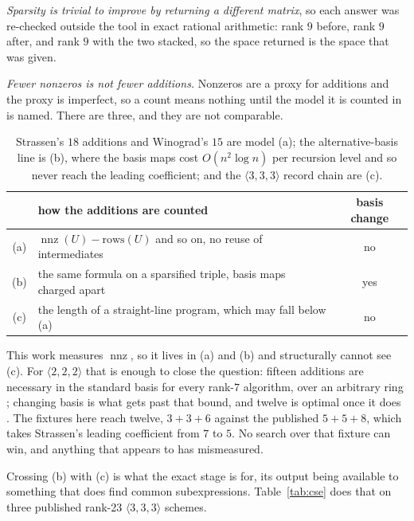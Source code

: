 \documentclass[11pt,reqno]{amsart}
\theoremstyle{plain}
\theoremstyle{definition}
\theoremstyle{remark}
\newcommand{\nnz}{\operatorname{nnz}}
\begin{document}
\emph{Sparsity is trivial to improve by returning a different matrix}, so each
answer was re-checked outside the tool in exact rational arithmetic: rank $9$
before, rank $9$ after, and rank $9$ with the two stacked, so the space returned
is the space that was given.

\emph{Fewer nonzeros is not fewer additions.} Nonzeros are a proxy for additions
and the proxy is imperfect, so a count means nothing until the model it is
counted in is named. There are three, and they are not comparable.

\begin{table}[ht]
\centering
\begin{tabular}{clc}
\toprule
 & how the additions are counted & basis change \\
\midrule
(a) & $\nnz(U)-\mathrm{rows}(U)$ and so on, no reuse of intermediates & no \\
(b) & the same formula on a sparsified triple, basis maps charged apart & yes \\
(c) & the length of a straight-line program, which may fall below (a) & no \\
\bottomrule
\end{tabular}
\vspace{0.5em}
\caption{Strassen's $18$ additions and Winograd's $15$ are model (a); the
alternative-basis line \cite{karstadt2017,beniamini2020,holtz2025} is (b), where
the basis maps cost $O(n^{2}\log n)$ per recursion level and so never reach the
leading coefficient; \cite{plinopt} and the $\langle 3,3,3\rangle$ record chain
are (c).}\label{tab:models}
\end{table}

This work measures $\nnz$, so it lives in (a) and (b) and structurally cannot see
(c). For $\langle 2,2,2\rangle$ that is enough to close the question: fifteen
additions are necessary in the standard basis for every rank-$7$ algorithm, over
an arbitrary ring \cite{probert1976,bshouty1995}; changing basis is what gets
past that bound, and twelve is optimal once it does
\cite[Thm.~1.2]{karstadt2017}. The fixtures here reach twelve, $3+3+6$ against
the published $5+5+8$, which takes Strassen's leading coefficient from $7$ to
$5$. No search over that fixture can win, and anything that appears to has
mismeasured.

Crossing (b) with (c) is what the exact stage is for, its output being available
to something that does find common subexpressions. Table~\ref{tab:cse} does that
on three published rank-23 $\langle 3,3,3\rangle$ schemes.
\end{document}
